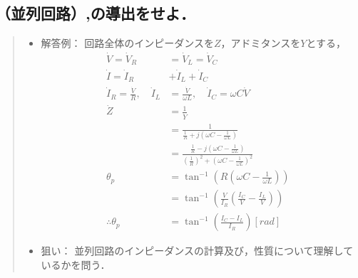 \documentclass[11pt,dvipdfmx]{jarticle}
\begin{document}
\subsection{（並列回路）,の導出をせよ．}
\begin{quote}
\begin{itemize}
\item 解答例：
回路全体のインピーダンスを$Z$，アドミタンスを$Y$とする，\\
\begin{align*}
\dot{V}=\dot{V}_{R}&=\dot{V}_L=\dot{V}_{C}\\
\dot{I}=\dot{I}_{R}&+\dot{I}_{L}+\dot{I}_{C}\\
\dot{I}_{R}=\frac{\dot{V}}{R},\quad \dot{I}_{L}&=\frac{\dot{V}}{\omega L},\quad \dot{I}_{C}=\omega C\dot{V}\\
\dot{Z}&=\frac{1}{\dot{Y}}\\
&=\frac{1}{\frac{1}{R}+j\left(\omega C-\frac{1}{\omega L}\right)}\\
&=\frac{\frac{1}{R}-j\left(\omega C-\frac{1}{\omega L}\right)}{\left(\frac{1}{R}\right)^{2}+\left(\omega C-\frac{1}{\omega L}\right)^{2}}\tag{*}\\
\theta_{p}&=\tan^{-1}\left(R\left(\omega C-\frac{1}{\omega L}\right)\right)\\
&=\tan^{-1}\left(\frac{V}{I_{R}}\left(\frac{I_{C}}{V}-\frac{I_{L}}{V}\right)\right)\\
\therefore \theta_{p}&=\tan^{-1}\left(\frac{I_{C}-I_{L}}{I_{R}}\right)[rad]
\end{align*}
\item 狙い：
並列回路のインピーダンスの計算及び，性質について理解しているかを問う．
\end{itemize}
\end{quote}
\end{document}
